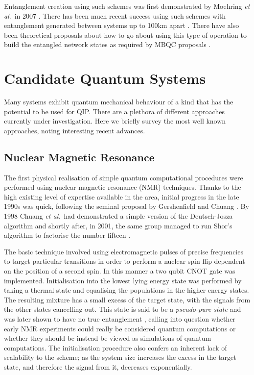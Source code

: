 Entanglement creation using such schemes was first demonstrated by Moehring \textit{et al}.\ in 2007 \cite{Moehring:2007p6099}. There has been much recent success using such schemes with entanglement generated between systems up to 100km apart \cite{entanglement_97km_08, entanglement_144km_07}. There have also been theoretical proposals about how to go about using this type of operation to build the entangled network states as required by MBQC proposals \cite{Benjamin:2006p6123}.


\section{Candidate Quantum Systems}

Many systems exhibit quantum mechanical behaviour of a kind that has the potential to be used for QIP. There are a plethora of different approaches currently under investigation. Here we briefly survey the most well known approaches, noting interesting recent advances.

\subsection{Nuclear Magnetic Resonance}

The first physical realisation of simple quantum computational procedures were performed using nuclear magnetic resonance (NMR) techniques. Thanks to the high existing level of expertise available in the area, initial progress in the late 1990s was quick, following the seminal proposal by Gershenfield and Chuang \cite{nmr_proposal_chuang_97}.  By 1998 Chuang \textit{et al}.\ had demonstrated a simple version of the Deutsch-Josza algorithm \cite{chuang_first_nmr_realisation_98} and shortly after, in 2001, the same group managed to run Shor's algorithm to factorise the number fifteen \cite{nmr_factorise_15_01}.

The basic technique involved using electromagnetic pulses of precise frequencies to target particular transitions in order to perform a nuclear spin flip dependent on the position of a second spin. In this manner a two qubit CNOT gate was implemented.  Initialisation into the lowest lying energy state was performed by taking a thermal state and equalising the populations in the higher energy states. The resulting mixture has a small excess of the target state, with the signals from the other states cancelling out. This state is said to be a \textit{pseudo-pure state} and was later shown to have no true entanglement \cite{nmr_pseudo_pure}, calling into question whether early NMR experiments could really be considered quantum computations or whether they should be instead be viewed as simulations of quantum computations. The initialisation procedure also confers an inherent lack of scalability to the scheme; as the system size increases the excess in the target state, and therefore the signal from it, decreases exponentially.

